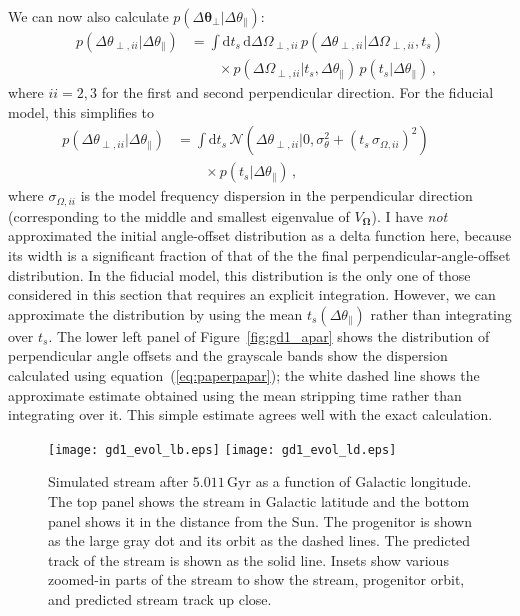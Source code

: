 \documentclass{emulateapj}
\newcommand{\dd}{\mathrm{d}}
\newcommand{\eqnname}{equation}
\newcommand{\equationname}{\eqnname}
\renewcommand{\figurename}{Figure}
\renewcommand{\vec}[1]{\ensuremath{\mathbf{#1}}}
\newcommand{\veco}{\ensuremath{\vec{\Omega}}}
\newcommand{\veca}{\ensuremath{\boldsymbol\theta}}
\newcommand{\Gyr}{\ensuremath{\,\mathrm{Gyr}}}
\newcommand{\apar}{\ensuremath{\theta_\parallel}}
\newcommand{\aperp}{\ensuremath{\veca_\perp}}
\newcommand{\aperpii}{\ensuremath{\theta_{\perp,ii}}}
\newcommand{\operpii}{\ensuremath{\Omega_{\perp,ii}}}
\newcommand{\ts}{\ensuremath{t_s}}
\begin{document}
We can now also calculate $p(\Delta \aperp|\Delta \apar)$:
\begin{equation}
\begin{split}
  p(\Delta \aperpii|\Delta \apar) & = \int \dd \ts \,\dd \Delta
  \operpii \,p(\Delta \aperpii|\Delta \operpii,\ts)\\
  & \qquad \times p(\Delta \operpii|\ts,\Delta \apar)\,p(\ts|\Delta \apar)\,,
\end{split}
\end{equation}
where $ii=2,3$ for the first and second perpendicular direction. For
the fiducial model, this simplifies to
\begin{equation}\label{eq:paperpapar}
\begin{split}
  p(\Delta \aperpii|\Delta \apar) & = \int \dd \ts \,\mathcal{N}\left(\Delta \aperpii|0,\sigma_{\theta}^2+(\ts\,\sigma_{\Omega,ii})^2\right)\qquad\\
& \qquad \times p(\ts|\Delta \apar)\,,
\end{split}
\end{equation}
where $\sigma_{\Omega,ii}$ is the model frequency dispersion in the
perpendicular direction (corresponding to the middle and smallest
eigenvalue of $V_\veco$). I have \emph{not} approximated the initial
angle-offset distribution as a delta function here, because its width
is a significant fraction of that of the the final
perpendicular-angle-offset distribution. In the fiducial model, this
distribution is the only one of those considered in this section that
requires an explicit integration. However, we can approximate the
distribution by using the mean $\ts(\Delta \apar)$ rather than
integrating over $\ts$. The lower left panel of
\figurename~\ref{fig:gd1_apar} shows the distribution of perpendicular
angle offsets and the grayscale bands show the dispersion calculated
using \equationname~(\ref{eq:paperpapar}); the white dashed line shows
the approximate estimate obtained using the mean stripping time rather
than integrating over it. This simple estimate agrees well with the
exact calculation.

\begin{figure}[t!]
\begin{center}
  \texttt{[image: gd1\_evol\_lb.eps]}
  \texttt{[image: gd1\_evol\_ld.eps]}
  \caption{Simulated stream after $5.011\Gyr$ as a function of
    Galactic longitude. The top panel shows the stream in Galactic
    latitude and the bottom panel shows it in the distance from the
    Sun. The progenitor is shown as the large gray dot and its orbit
    as the dashed lines. The predicted track of the stream is shown as
    the solid line. Insets show various zoomed-in parts of the stream
    to show the stream, progenitor orbit, and predicted stream track
    up close.}\label{fig:gd1_lbd}
\end{center}
\end{figure}
\end{document}
